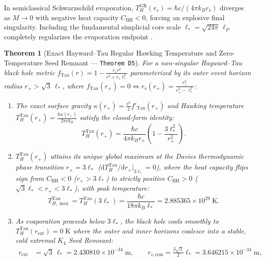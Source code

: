 \documentclass[11pt,a4paper]{article}
\newtheorem{theorem}{Theorem}[section]
\theoremstyle{remark}
\begin{document}
In semiclassical Schwarzschild evaporation, $T_H^{\mathrm{GR}}(r_s) = \hbar c/(4\pi k_B r_s)$ diverges as $M \to 0$ with negative heat capacity $C_{\mathrm{BH}} < 0$, forcing an explosive final singularity. Including the fundamental simplicial core scale $\ell_* = \sqrt{24\pi}\,\ell_P$ completely regularizes the evaporation endpoint \cite{Hayward2006RegularBH,Davies1977Phase}.

\begin{theorem}[Exact Hayward--Tau Regular Hawking Temperature and Zero-Temperature Seed Remnant --- \texttt{Theorem D5}]
\label{thm:d5}
For a non-singular Hayward--Tau black hole metric $f_{\mathrm{Tau}}(r) = 1 - \frac{r_s r^2}{r^3 + r_s \ell_*^2}$ parameterized by its outer event horizon radius $r_+ > \sqrt{3}\,\ell_*$, where $f_{\mathrm{Tau}}(r_+) = 0 \iff r_s(r_+) = \frac{r_+^3}{r_+^2 - \ell_*^2}$:
\begin{enumerate}
  \item The exact surface gravity $\kappa(r_+) = \frac{c^2}{2}f'_{\mathrm{Tau}}(r_+)$ and Hawking temperature $T_H^{\mathrm{Tau}}(r_+) = \frac{\hbar\kappa(r_+)}{2\pi c k_B}$ satisfy the closed-form identity:
  \begin{equation}
    T_H^{\mathrm{Tau}}(r_+) = \frac{\hbar c}{4\pi k_B r_+}\!\left(1 - \frac{3\ell_*^2}{r_+^2}\right).
    \label{eq:t_hawking_tau}
  \end{equation}
  \item $T_H^{\mathrm{Tau}}(r_+)$ attains its unique global maximum at the Davies thermodynamic phase transition $r_+ = 3\ell_*$ ($\mathrm{d}T_H^{\mathrm{Tau}}/\mathrm{d}r_+|_{3\ell_*} = 0$), where the heat capacity flips sign from $C_{\mathrm{BH}} < 0$ ($r_+ > 3\ell_*$) to strictly positive $C_{\mathrm{BH}} > 0$ ($\sqrt{3}\ell_* < r_+ < 3\ell_*$), with peak temperature:
  \begin{equation}
    T_{H,\max}^{\mathrm{Tau}} = T_H^{\mathrm{Tau}}(3\ell_*) = \frac{\hbar c}{18\pi k_B \ell_*} = 2.885365 \times 10^{29}\;\mathrm{K}.
    \label{eq:t_hawking_max}
  \end{equation}
  \item As evaporation proceeds below $3\ell_*$, the black hole cools smoothly to $T_H^{\mathrm{Tau}}(r_{\mathrm{ext}}) = 0\;\mathrm{K}$ where the outer and inner horizons coalesce into a stable, cold extremal $K_4$ Seed Remnant:
  \begin{align}
    r_{\mathrm{ext}} &= \sqrt{3}\,\ell_* = 2.430810 \times 10^{-34}\;\mathrm{m}, \qquad
    r_{s,\mathrm{rem}} = \frac{3\sqrt{3}}{2}\ell_* = 3.646215 \times 10^{-34}\;\mathrm{m}, \nonumber\\

\end{align}
\end{enumerate}
\end{theorem}
\end{document}
